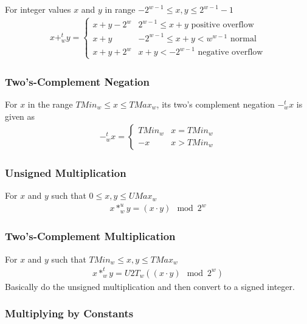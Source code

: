 \documentclass[10pt]{armath}
\begin{document}
For integer values $x$ and $y$ in range $-2^{w-1}\leq x,y \leq 2^{w-1}-1$
\begin{align*}
  x+_w^ty=\begin{cases}
    x+y-2^w & 2^{w-1}\leq x+y\text{  positive overflow}\\
    x+y & -2^{w-1}\leq x+y < w^{w-1}\text{  normal}\\
    x+y+2^w & x+y < -2^{w-1}\text{  negative overflow}
  \end{cases}
\end{align*}

\subsubsection{Two's-Complement Negation}%
\label{ssub:two_s_complement_negation}

For $x$ in the range $TMin_w\leq x\leq TMax_w$, its two's complement negation
$-_w^tx$ is given as
\begin{align*}
  -_w^tx=\begin{cases}
    TMin_w & x=TMin_w\\
    -x & x>TMin_w
  \end{cases}
\end{align*}

\subsubsection{Unsigned Multiplication}%
\label{ssub:unsigned_multiplication}

For $x$ and $y$ such that $0\leq x,y\leq UMax_w$
\begin{align*}
  x *_w^uy=(x\cdot y)\mod 2^w
\end{align*}

\subsubsection{Two's-Complement Multiplication}%
\label{ssub:two_s_complement_multiplication}

For $x$ and $y$ such that $TMin_w\leq x,y \leq TMax_w$
\begin{align*}
  x*_w^ty=U2T_w((x\cdot y)\mod 2^w)
\end{align*}
Basically do the unsigned multiplication and then convert to a signed integer.

\subsubsection{Multiplying by Constants}%
\label{ssub:multiplying_by_constants}
\end{document}
